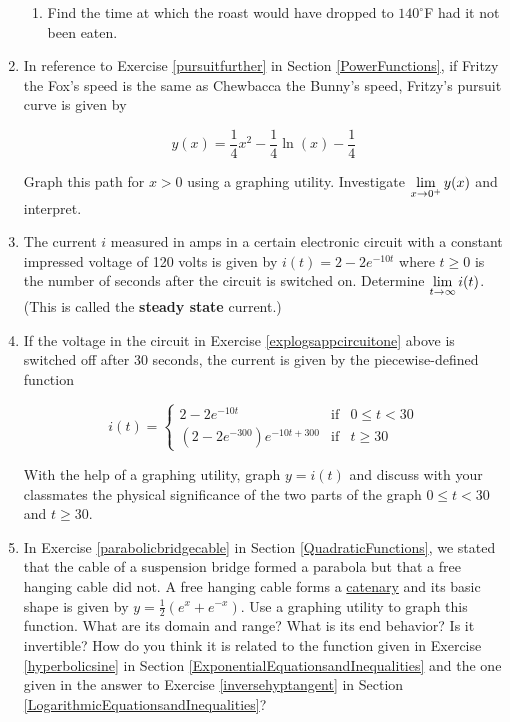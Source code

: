 \documentclass{ximera}
\begin{document}
\begin{enumerate}
\begin{enumerate}
\item Find the time at which the roast would have dropped to $140^{\circ}$F had it not been eaten. 

\end{enumerate}

\item  \label{pursuitlog} In reference to Exercise \ref{pursuitfurther} in Section \ref{PowerFunctions}, if Fritzy the Fox's speed is the same as Chewbacca the Bunny's speed, Fritzy's pursuit curve is given by

\[y(x) = \frac{1}{4} x^2-\frac{1}{4} \ln(x)-\frac{1}{4}\]

Graph this path for $x > 0$ using a graphing utility.  Investigate  $\ds{\lim_{x \rightarrow 0^{+}}  y(x)}$ and interpret.

\item \label{explogsappcircuitone} The current $i$ measured in amps in a certain electronic circuit with a constant impressed voltage of 120 volts is given by $i(t) = 2 - 2e^{-10t}$ where $t \geq 0$ is the number of seconds after the circuit is switched on.  Determine  $\ds{\lim_{t \rightarrow \infty} i(t)}$.  (This is called the \textbf{steady state} current.)


\item If the voltage in the circuit in Exercise \ref{explogsappcircuitone} above is switched off after 30 seconds, the current is given by the piecewise-defined function 

\[i(t) = \left\{ \begin{array}{rcl} 2 - 2e^{-10t} & \mbox{if} & 0 \leq t < 30 \\ [6pt]
\left(2 - 2e^{-300}\right) e^{-10t+300} & \mbox{if} & t \geq 30 \end{array} \right.\]  

With the help of a graphing utility, graph $y = i(t)$ and discuss with your classmates the physical significance of the two parts of the graph $0 \leq t < 30$ and $t \geq 30$.


\item \label{catenary} In Exercise \ref{parabolicbridgecable} in Section \ref{QuadraticFunctions}, we stated that the cable of a suspension bridge formed a parabola but that a free hanging cable did not.  A free hanging cable forms a \underline{catenary} and its basic shape is given by $y = \frac{1}{2}\left(e^{x} + e^{-x}\right)$.  Use a graphing utility to graph this function.  What are its domain and range?  What is its end behavior?  Is it invertible?  How do you think it is related to the function given in Exercise \ref{hyperbolicsine} in Section \ref{ExponentialEquationsandInequalities} and the one given in the answer to Exercise \ref{inversehyptangent} in Section \ref{LogarithmicEquationsandInequalities}?  


\end{enumerate}
\end{document}
